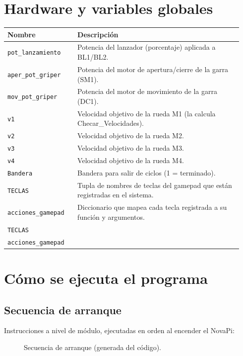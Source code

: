 \section{Hardware y variables globales}
\begin{longtable}{@{}p{0.28\linewidth}p{0.66\linewidth}@{}}\toprule
\textbf{Nombre} & \textbf{Descripci\'on} \\\midrule\endhead
\texttt{pot\_lanzamiento} & Potencia del lanzador (porcentaje) aplicada a BL1/BL2. \\
\texttt{aper\_pot\_griper} & Potencia del motor de apertura/cierre de la garra (SM1). \\
\texttt{mov\_pot\_griper} & Potencia del motor de movimiento de la garra (DC1). \\
\texttt{v1} & Velocidad objetivo de la rueda M1 (la calcula Checar\_Velocidades). \\
\texttt{v2} & Velocidad objetivo de la rueda M2. \\
\texttt{v3} & Velocidad objetivo de la rueda M3. \\
\texttt{v4} & Velocidad objetivo de la rueda M4. \\
\texttt{Bandera} & Bandera para salir de ciclos (1 = terminado). \\
\texttt{TECLAS} & Tupla de nombres de teclas del gamepad que están registradas en el sistema. \\
\texttt{acciones\_gamepad} & Diccionario que mapea cada tecla registrada a su función y argumentos. \\
\texttt{TECLAS} &  \\
\texttt{acciones\_gamepad} &  \\
\bottomrule\end{longtable}
\section{C\'omo se ejecuta el programa}
\subsection{Secuencia de arranque}
Instrucciones a nivel de m\'odulo, ejecutadas en orden al encender el NovaPi:

\begin{figure}[H]\centering
{}
\caption{Secuencia de arranque (generada del c\'odigo).}\end{figure}
